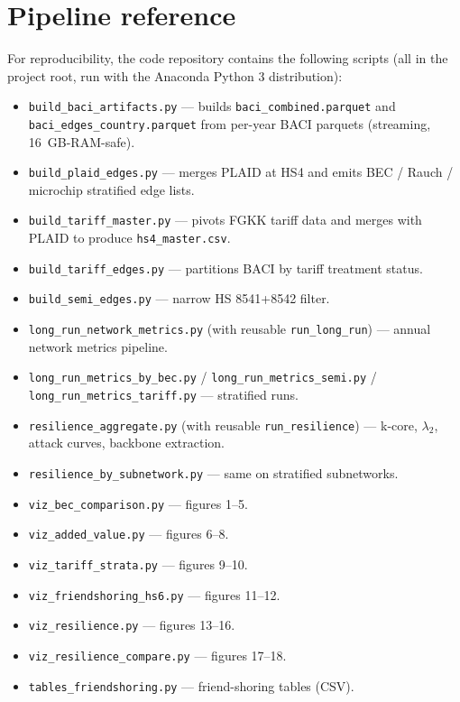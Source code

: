 \documentclass[11pt,a4paper]{article}
\begin{document}
\section{Pipeline reference}

For reproducibility, the code repository contains the following scripts
(all in the project root, run with the Anaconda Python 3 distribution):

\begin{itemize}[leftmargin=*,itemsep=2pt]
  \item \texttt{build\_baci\_artifacts.py} — builds
        \texttt{baci\_combined.parquet} and \texttt{baci\_edges\_country.parquet}
        from per-year BACI parquets (streaming, 16~GB-RAM-safe).
  \item \texttt{build\_plaid\_edges.py} — merges PLAID at HS4 and
        emits BEC / Rauch / microchip stratified edge lists.
  \item \texttt{build\_tariff\_master.py} — pivots FGKK tariff data and
        merges with PLAID to produce \texttt{hs4\_master.csv}.
  \item \texttt{build\_tariff\_edges.py} — partitions BACI by tariff
        treatment status.
  \item \texttt{build\_semi\_edges.py} — narrow HS 8541+8542 filter.
  \item \texttt{long\_run\_network\_metrics.py} (with reusable
        \texttt{run\_long\_run}) — annual network metrics pipeline.
  \item \texttt{long\_run\_metrics\_by\_bec.py} /
        \texttt{long\_run\_metrics\_semi.py} /
        \texttt{long\_run\_metrics\_tariff.py} — stratified runs.
  \item \texttt{resilience\_aggregate.py} (with reusable
        \texttt{run\_resilience}) — k-core, $\lambda_2$, attack curves,
        backbone extraction.
  \item \texttt{resilience\_by\_subnetwork.py} — same on stratified subnetworks.
  \item \texttt{viz\_bec\_comparison.py} — figures 1--5.
  \item \texttt{viz\_added\_value.py} — figures 6--8.
  \item \texttt{viz\_tariff\_strata.py} — figures 9--10.
  \item \texttt{viz\_friendshoring\_hs6.py} — figures 11--12.
  \item \texttt{viz\_resilience.py} — figures 13--16.
  \item \texttt{viz\_resilience\_compare.py} — figures 17--18.
  \item \texttt{tables\_friendshoring.py} — friend-shoring tables (CSV).
\end{itemize}
\end{document}
